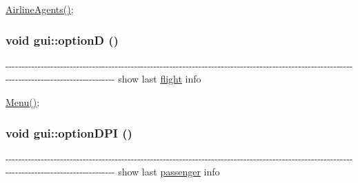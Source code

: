 \hyperlink{classgui_ae39757d1c6bdbfa938dbe3226a36febb}{AirlineAgents()}; \hypertarget{classgui_a0534e0904bd2e2e3694e3da5396d1339}{
\subsubsection[{optionD}]{\setlength{\rightskip}{0pt plus 5cm}void gui::optionD ()}}
\label{classgui_a0534e0904bd2e2e3694e3da5396d1339}
-\/-\/-\/-\/-\/-\/-\/-\/-\/-\/-\/-\/-\/-\/-\/-\/-\/-\/-\/-\/-\/-\/-\/-\/-\/-\/-\/-\/-\/-\/-\/-\/-\/-\/-\/-\/-\/-\/-\/-\/-\/-\/-\/-\/-\/-\/-\/-\/-\/-\/-\/-\/-\/-\/-\/-\/-\/-\/-\/-\/-\/-\/-\/-\/-\/-\/-\/-\/-\/-\/-\/-\/-\/-\/-\/-\/-\/-\/-\/-\/-\/-\/-\/-\/-\/-\/-\/-\/-\/-\/-\/-\/-\/-\/-\/-\/-\/-\/-\/-\/-\/-\/-\/-\/-\/-\/-\/-\/-\/-\/-\/-\/-\/-\/-\/-\/-\/-\/-\/-\/-\/-\/-\/-\/-\/-\/-\/-\/-\/-\/-\/-\/-\/-\/-\/-\/-\/-\/-\/-\/-\/-\/ show last \hyperlink{classflight}{flight} info 

\hyperlink{classgui_a57cd3dc1eca1d8cb7aabb9fa75d79702}{Menu()}; \hypertarget{classgui_ad59aed173b2688436ed753da2d0e903f}{
\subsubsection[{optionDPI}]{\setlength{\rightskip}{0pt plus 5cm}void gui::optionDPI ()}}
\label{classgui_ad59aed173b2688436ed753da2d0e903f}
-\/-\/-\/-\/-\/-\/-\/-\/-\/-\/-\/-\/-\/-\/-\/-\/-\/-\/-\/-\/-\/-\/-\/-\/-\/-\/-\/-\/-\/-\/-\/-\/-\/-\/-\/-\/-\/-\/-\/-\/-\/-\/-\/-\/-\/-\/-\/-\/-\/-\/-\/-\/-\/-\/-\/-\/-\/-\/-\/-\/-\/-\/-\/-\/-\/-\/-\/-\/-\/-\/-\/-\/-\/-\/-\/-\/-\/-\/-\/-\/-\/-\/-\/-\/-\/-\/-\/-\/-\/-\/-\/-\/-\/-\/-\/-\/-\/-\/-\/-\/-\/-\/-\/-\/-\/-\/-\/-\/-\/-\/-\/-\/-\/-\/-\/-\/-\/-\/-\/-\/-\/-\/-\/-\/-\/-\/-\/-\/-\/-\/-\/-\/-\/-\/-\/-\/-\/-\/-\/-\/-\/-\/ show last \hyperlink{classpassenger}{passenger} info 

